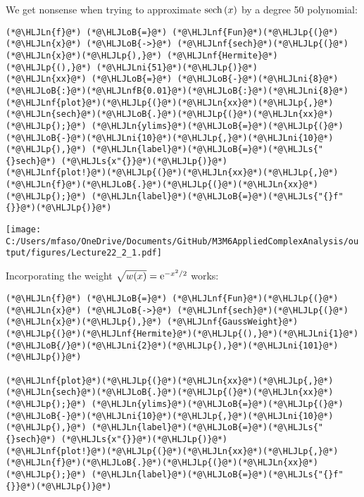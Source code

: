 \documentclass[12pt,landscape]{article}
\newcommand{\HLJLn}[1]{#1}
\newcommand{\HLJLnf}[1]{\textcolor[RGB]{66,102,213}{#1}}
\newcommand{\HLJLs}[1]{\textcolor[RGB]{201,61,57}{#1}}
\newcommand{\HLJLnfB}[1]{\textcolor[RGB]{59,151,46}{#1}}
\newcommand{\HLJLni}[1]{\textcolor[RGB]{59,151,46}{#1}}
\newcommand{\HLJLoB}[1]{\textcolor[RGB]{102,102,102}{\textbf{#1}}}
\newcommand{\HLJLp}[1]{#1}
\def\E{ {\rm e} }
\def\sech{ {\rm sech}\, }
\def\cent#1{\begin{center}#1\end{center} }
\begin{document}
{We get nonsense when trying to approximate $\sech(x)$ by a degree 50 polynomial:


\begin{lstlisting}
(*@\HLJLn{f}@*) (*@\HLJLoB{=}@*) (*@\HLJLnf{Fun}@*)(*@\HLJLp{(}@*)(*@\HLJLn{x}@*) (*@\HLJLoB{->}@*) (*@\HLJLnf{sech}@*)(*@\HLJLp{(}@*)(*@\HLJLn{x}@*)(*@\HLJLp{),}@*) (*@\HLJLnf{Hermite}@*)(*@\HLJLp{(),}@*) (*@\HLJLni{51}@*)(*@\HLJLp{)}@*)
(*@\HLJLn{xx}@*) (*@\HLJLoB{=}@*) (*@\HLJLoB{-}@*)(*@\HLJLni{8}@*)(*@\HLJLoB{:}@*)(*@\HLJLnfB{0.01}@*)(*@\HLJLoB{:}@*)(*@\HLJLni{8}@*)
(*@\HLJLnf{plot}@*)(*@\HLJLp{(}@*)(*@\HLJLn{xx}@*)(*@\HLJLp{,}@*) (*@\HLJLn{sech}@*)(*@\HLJLoB{.}@*)(*@\HLJLp{(}@*)(*@\HLJLn{xx}@*)(*@\HLJLp{);}@*) (*@\HLJLn{ylims}@*)(*@\HLJLoB{=}@*)(*@\HLJLp{(}@*)(*@\HLJLoB{-}@*)(*@\HLJLni{10}@*)(*@\HLJLp{,}@*)(*@\HLJLni{10}@*)(*@\HLJLp{),}@*) (*@\HLJLn{label}@*)(*@\HLJLoB{=}@*)(*@\HLJLs{"{}sech}@*) (*@\HLJLs{x"{}}@*)(*@\HLJLp{)}@*)
(*@\HLJLnf{plot!}@*)(*@\HLJLp{(}@*)(*@\HLJLn{xx}@*)(*@\HLJLp{,}@*) (*@\HLJLn{f}@*)(*@\HLJLoB{.}@*)(*@\HLJLp{(}@*)(*@\HLJLn{xx}@*)(*@\HLJLp{);}@*) (*@\HLJLn{label}@*)(*@\HLJLoB{=}@*)(*@\HLJLs{"{}f"{}}@*)(*@\HLJLp{)}@*)
\end{lstlisting}

\cent{\texttt{[image: C:/Users/mfaso/OneDrive/Documents/GitHub/M3M6AppliedComplexAnalysis/output/figures/Lecture22\_2\_1.pdf]}}

Incorporating the weight $\sqrt{w(x)} = \E^{-x^2/2}$ works:


\begin{lstlisting}
(*@\HLJLn{f}@*) (*@\HLJLoB{=}@*) (*@\HLJLnf{Fun}@*)(*@\HLJLp{(}@*)(*@\HLJLn{x}@*) (*@\HLJLoB{->}@*) (*@\HLJLnf{sech}@*)(*@\HLJLp{(}@*)(*@\HLJLn{x}@*)(*@\HLJLp{),}@*) (*@\HLJLnf{GaussWeight}@*)(*@\HLJLp{(}@*)(*@\HLJLnf{Hermite}@*)(*@\HLJLp{(),}@*)(*@\HLJLni{1}@*)(*@\HLJLoB{/}@*)(*@\HLJLni{2}@*)(*@\HLJLp{),}@*)(*@\HLJLni{101}@*)(*@\HLJLp{)}@*)

(*@\HLJLnf{plot}@*)(*@\HLJLp{(}@*)(*@\HLJLn{xx}@*)(*@\HLJLp{,}@*) (*@\HLJLn{sech}@*)(*@\HLJLoB{.}@*)(*@\HLJLp{(}@*)(*@\HLJLn{xx}@*)(*@\HLJLp{);}@*) (*@\HLJLn{ylims}@*)(*@\HLJLoB{=}@*)(*@\HLJLp{(}@*)(*@\HLJLoB{-}@*)(*@\HLJLni{10}@*)(*@\HLJLp{,}@*)(*@\HLJLni{10}@*)(*@\HLJLp{),}@*) (*@\HLJLn{label}@*)(*@\HLJLoB{=}@*)(*@\HLJLs{"{}sech}@*) (*@\HLJLs{x"{}}@*)(*@\HLJLp{)}@*)
(*@\HLJLnf{plot!}@*)(*@\HLJLp{(}@*)(*@\HLJLn{xx}@*)(*@\HLJLp{,}@*) (*@\HLJLn{f}@*)(*@\HLJLoB{.}@*)(*@\HLJLp{(}@*)(*@\HLJLn{xx}@*)(*@\HLJLp{);}@*) (*@\HLJLn{label}@*)(*@\HLJLoB{=}@*)(*@\HLJLs{"{}f"{}}@*)(*@\HLJLp{)}@*)
\end{lstlisting}

}
\end{document}
